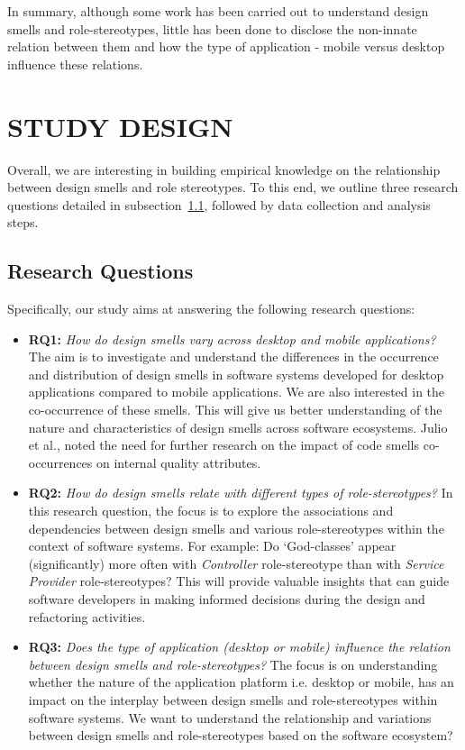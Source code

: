 \documentclass[AMA,Times1COL]{WileyNJDv5} %
\begin{document}
In summary, although some work has been carried out to understand design smells and role-stereotypes, little has been done to disclose the non-innate relation between them and how the type of application - mobile versus desktop influence these relations.

\section{STUDY DESIGN}\label{sec:method}
Overall, we are interesting in building empirical knowledge on the relationship between design smells and role stereotypes. To this end, we outline three research questions detailed in subsection~\ref{sec:researchquestion}, followed by data collection and analysis steps.
\subsection{Research Questions}\label{sec:researchquestion}
Specifically, our study aims at answering the following research questions: 
\begin{itemize}
	\item \textbf{RQ1:} \textit{How do design smells vary across desktop and mobile applications?} The aim is to investigate and understand the differences in the occurrence and distribution of design smells in software systems developed for desktop applications compared to mobile applications. We are also interested in the co-occurrence of these smells. This will give us better understanding of the nature and characteristics of design smells across software ecosystems. Julio et al.,\cite{martins2020code} noted the need for further research on the impact of code smells co-occurrences on internal quality attributes.
	\item \textbf{RQ2:} \textit{How do design smells relate with different types of role-stereotypes?} In this research question, the focus is to explore the associations and dependencies between design smells and various role-stereotypes within the context of software systems. For example: Do `God-classes’ appear (significantly) more often with \textit{Controller} role-stereotype than with \textit{Service Provider} role-stereotypes? This will provide valuable insights that can guide software developers in making informed decisions during the design and refactoring activities.
	\item \textbf{RQ3:} \textit{Does the type of application (desktop or mobile) influence the relation between design smells and role-stereotypes?} The focus is on understanding whether the nature of the application platform i.e. desktop or mobile, has an impact on the interplay between design smells and role-stereotypes within software systems. We want to understand the relationship and variations between design smells and role-stereotypes based on the software ecosystem?
\end{itemize} 
\end{document}
